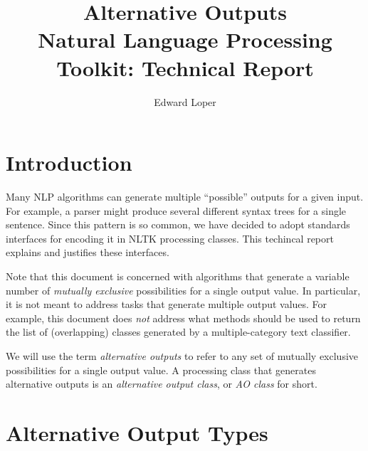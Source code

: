 \documentclass[11pt]{article}
\begin{document}
\title{Alternative Outputs\\
\Large Natural Language Processing Toolkit: Technical Report}
\author{Edward Loper}
\maketitle



\section{Introduction}

  Many NLP algorithms can generate multiple ``possible'' outputs for a
  given input.  For example, a parser might produce several different
  syntax trees for a single sentence.  Since this pattern is so
  common, we have decided to adopt standards interfaces for encoding
  it in NLTK processing classes.  This techincal report explains and
  justifies these interfaces.

  Note that this document is concerned with algorithms that generate a
  variable number of \emph{mutually exclusive} possibilities for a
  single output value.  In particular, it is not meant to address
  tasks that generate multiple output values.  For example, this
  document does \emph{not} address what methods should be used to
  return the list of (overlapping) classes generated by a
  multiple-category text classifier.

  We will use the term \emph{alternative outputs} to refer to any set
  of mutually exclusive possibilities for a single output value.  A
  processing class that generates alternative outputs is an
  \emph{alternative output class}, or \emph{AO class} for short.

\section{Alternative Output Types}
\end{document}
